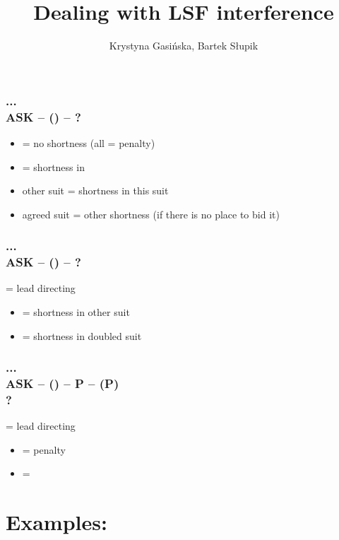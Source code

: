 \documentclass[12pt, a4paper]{article}
\title{Dealing with LSF interference}
\author{Krystyna Gasińska, Bartek Słupik}
\begin{document}
\maketitle


\subsubsection*{...\\{\color{WildStrawberry}\textbf{ASK}\color{black}} -- (\anysuit{\textbullet}) -- ?}
\begin{itemize}
    \item \pass = no shortness (all \dbl = penalty)
    \item \dbl = shortness in \anysuit{\textbullet}
    \item other suit = shortness in this suit
    \item agreed suit = other shortness (if there is no place to bid it)
\end{itemize}

\subsubsection*{...\\{\color{WildStrawberry}\textbf{ASK}\color{black}} -- (\dbl) -- ?}
\dbl = lead directing
\begin{itemize}
    \item \pass = shortness in other suit
    \item \rdbl = shortness in doubled suit
\end{itemize}

\subsubsection*{...
                \\{\color{WildStrawberry}\textbf{ASK}\color{black}} -- (\dbl) -- P -- (P)
                \\?}
\dbl = lead directing
\begin{itemize}
    \item \pass = penalty
    \item \rdbl = \lsf
\end{itemize}


\section*{Examples:}
\end{document}
